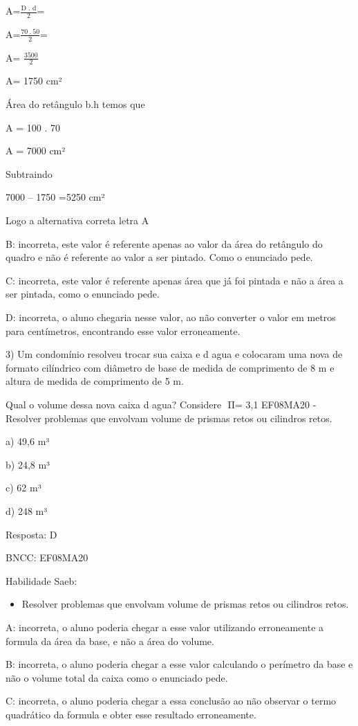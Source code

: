 {A=\(\frac{\text{D\ .\ d}}{2}\)=

A=\(\frac{70\ .\ 50}{2}\)=

A= \(\frac{3500}{2}\)

A= 1750 cm²

Área do retângulo b.h temos que

A = 100 . 70

A = 7000 cm²

Subtraindo

7000 -- 1750 =5250 cm²

Logo a alternativa correta letra A

B: incorreta, este valor é referente apenas ao valor da área do
retângulo do quadro e não é referente ao valor a ser pintado. Como o
enunciado pede.

C: incorreta, este valor é referente apenas área que já foi pintada e
não a área a ser pintada, como o enunciado pede.

D: incorreta, o aluno chegaria nesse valor, ao não converter o valor em
metros para centímetros, encontrando esse valor erroneamente.

3) Um condomínio resolveu trocar sua caixa e d agua e colocaram uma nova
de formato cilíndrico com diâmetro de base de medida de comprimento de 8
m e altura de medida de comprimento de 5 m.

Qual o volume dessa nova caixa d agua? Considere \(\text{\ Π}\)= 3,1
EF08MA20 - Resolver problemas que envolvam volume de prismas retos ou
cilindros retos.

a) 49,6 m³

b) 24,8 m³

c) 62 m³

d) 248 m³

Resposta: D

BNCC: EF08MA20

Habilidade Saeb:

\begin{itemize}
\tightlist
\item
  Resolver problemas que envolvam volume de prismas retos ou cilindros
  retos.
\end{itemize}

A: incorreta, o aluno poderia chegar a esse valor utilizando
erroneamente a formula da área da base, e não a área do volume.

B: incorreta, o aluno poderia chegar a esse valor calculando o perímetro
da base e não o volume total da caixa como o enunciado pede.

C: incorreta, o aluno poderia chegar a essa conclusão ao não observar o
termo quadrático da formula e obter esse resultado erroneamente.

}
